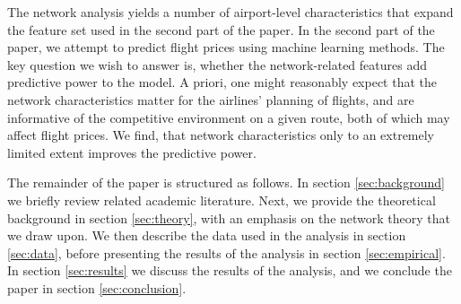 \medskip

The network analysis yields a number of airport-level characteristics that expand the feature set used in the second part of the paper. In the second part of the paper, we attempt to predict flight prices using machine learning methods. The key question we wish to answer is, whether the network-related features add predictive power to the model. A priori, one might reasonably expect that the network characteristics matter for the airlines' planning of flights, and are informative of the competitive environment on a given route, both of which may affect flight prices. We find, that network characteristics only to an extremely limited extent improves the predictive power. 

\medskip
The remainder of the paper is structured as follows. In section \ref{sec:background} we briefly review related academic literature. Next, we provide the theoretical background in section \ref{sec:theory}, with an emphasis on the network theory that we draw upon. We then describe the data used in the analysis in section \ref{sec:data}, before presenting the results of the analysis in section \ref{sec:empirical}. In section \ref{sec:results} we discuss the results of the analysis, and we conclude the paper in section \ref{sec:conclusion}.
